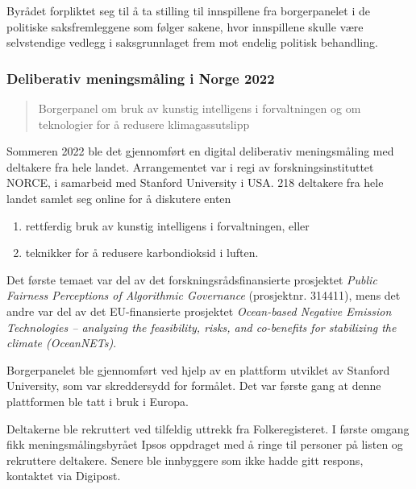\documentclass[
  12pt,
  a4paper, 12pt]{article}
\providecommand{\tightlist}{%
  \setlength{\itemsep}{0pt}\setlength{\parskip}{0pt}}
\begin{document}
Byrådet forpliktet seg til å ta stilling til innspillene fra borgerpanelet i de politiske saksfremleggene som følger sakene, hvor innspillene skulle være selvstendige vedlegg i saksgrunnlaget frem mot endelig politisk behandling.

\hypertarget{deliberativ-meningsmuxe5ling-i-norge-2022}{%
\subsubsection{Deliberativ meningsmåling i Norge 2022}\label{deliberativ-meningsmuxe5ling-i-norge-2022}}

\begin{quote}
Borgerpanel om bruk av kunstig intelligens i forvaltningen og om teknologier for å redusere klimagassutslipp
\end{quote}

Sommeren 2022 ble det gjennomført en digital deliberativ meningsmåling med deltakere fra hele landet. Arrangementet var i regi av forskningsinstituttet NORCE, i samarbeid med Stanford University i USA. 218 deltakere fra hele landet samlet seg online for å diskutere enten

\begin{enumerate}
\def\labelenumi{\arabic{enumi})}
\tightlist
\item
  rettferdig bruk av kunstig intelligens i forvaltningen, eller\\
\item
  teknikker for å redusere karbondioksid i luften.
\end{enumerate}

Det første temaet var del av det forskningsrådsfinansierte prosjektet \emph{Public Fairness Perceptions of Algorithmic Governance} (prosjektnr. 314411), mens det andre var del av det EU-finansierte prosjektet \emph{Ocean-based Negative Emission Technologies -- analyzing the feasibility, risks, and co-benefits for stabilizing the climate (OceanNETs)}.

Borgerpanelet ble gjennomført ved hjelp av en plattform utviklet av Stanford University, som var skreddersydd for formålet. Det var første gang at denne plattformen ble tatt i bruk i Europa.

Deltakerne ble rekruttert ved tilfeldig uttrekk fra Folkeregisteret. I første omgang fikk meningsmålingsbyrået Ipsos oppdraget med å ringe til personer på listen og rekruttere deltakere. Senere ble innbyggere som ikke hadde gitt respons, kontaktet via Digipost.

\newpage
\end{document}
